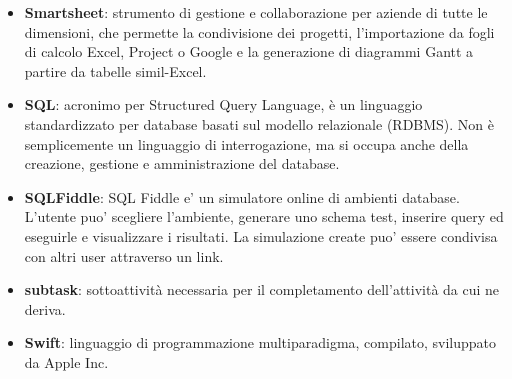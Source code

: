 \begin{itemize}
	\item \textbf{Smartsheet}: strumento di gestione e collaborazione per aziende di tutte le dimensioni, che permette la condivisione dei progetti, l'importazione da fogli di calcolo Excel, Project o Google e la generazione di diagrammi Gantt a partire da tabelle simil-Excel.
	\item \textbf{SQL}: acronimo per Structured Query Language, è un linguaggio standardizzato per database basati sul modello relazionale (RDBMS). Non è semplicemente un linguaggio di interrogazione, ma si occupa anche della creazione, gestione e amministrazione del database.
	\item \textbf{SQLFiddle}: SQL Fiddle e' un simulatore online di ambienti database. L'utente puo' scegliere l'ambiente, generare uno schema test, inserire query ed eseguirle e visualizzare i risultati. La simulazione create puo' essere condivisa con altri user attraverso un link.
	\item \textbf{subtask}: sottoattività necessaria per il completamento dell'attività da cui ne deriva. 
	\item \textbf{Swift}: linguaggio di programmazione multiparadigma, compilato, sviluppato da Apple Inc.
\end{itemize}